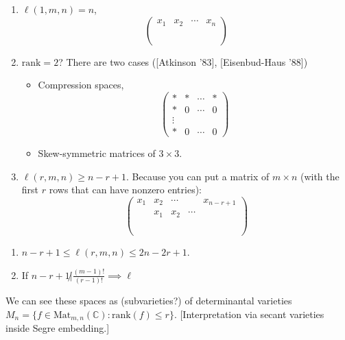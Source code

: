 \begin{example}
\label{example-what-we-know}
\begin{enumerate}
\item $\ell(1,m,n)=n$,
$$
\begin{pmatrix}
x_1&x_2&\cdots &x_n\\
\\
\\
\\
\end{pmatrix}
$$
\item $\text{rank}=2$? There are two cases
([Atkinson '83], [Eisenbud-Haus '88])
\begin{itemize}
\item Compression spaces,
$$
\begin{pmatrix}
*&*&\cdots &*\\
*&0&\cdots & 0\\
\vdots &\\
*&0&\cdots&0
\end{pmatrix}
$$
\item Skew-symmetric matrices of $3 \times
3$.
\end{itemize}
\item $\ell(r,m,n) \geq n-r+1$. Because you
can put a matrix of
$m\times n$ (with the first $r$ rows that can
have nonzero entries):
$$
\begin{pmatrix}
x_1 &  x_2 &  \cdots & & x_{n-r+1}\\
& x_1 & x_2 & \cdots &\\
\\
\\
\\
\end{pmatrix}
$$
\end{enumerate}
\end{example}

\begin{theorem}[Westwick '86]
\label{theorem-Westwick}
\begin{enumerate}
\item $n-r+1 \leq \ell(r,m,n) \leq 2n-2r+1$.
\item If $n-r+1 \not|
\frac{(m-1)!}{(r-1)!}\implies \ell$
\end{enumerate}
\end{theorem}

We can see these spaces as (subvarieties?) of
determinantal varieties
$M_n=\{f \in
\text{Mat}_{m,n}(\mathbb{C}):\text{rank}(f)
\leq  r\}$.
[Interpretation via secant varieties inside
Segre embedding.]

